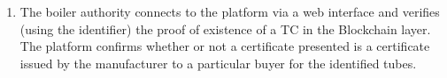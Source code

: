 \documentclass{article}
\begin{document}
\begin{enumerate}
\item
The boiler authority connects to the platform via a web interface and verifies (using the identifier) the proof of existence of a TC in the Blockchain layer. The platform confirms whether or not a
certificate presented is a certificate issued by the manufacturer to a particular buyer for the identified tubes.
\end{enumerate} 
\end{document}
